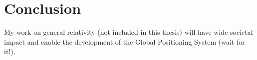 \chapter{Conclusion}
\label{conclusion}

My work on general relativity (not included in this thesis) will have wide societal impact and enable the development of the Global Positioning System (wait for it!).
